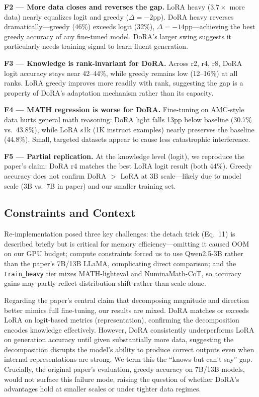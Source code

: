 \documentclass[11pt,twocolumn]{article}
\begin{document}
\textbf{F2 --- More data closes and reverses the gap.} LoRA heavy ($3.7{\times}$ more data) nearly equalizes logit and greedy ($\Delta{=}{-}2$pp). DoRA heavy reverses dramatically---greedy (46\%) exceeds logit (32\%), $\Delta{=}{-}14$pp---achieving the best greedy accuracy of any fine-tuned model. DoRA's larger swing suggests it particularly needs training signal to learn fluent generation.

\textbf{F3 --- Knowledge is rank-invariant for DoRA.} Across r2, r4, r8, DoRA logit accuracy stays near 42--44\%, while greedy remains low (12--16\%) at all ranks. LoRA greedy improves more readily with rank, suggesting the gap is a property of DoRA's adaptation mechanism rather than its capacity.

\textbf{F4 --- MATH regression is worse for DoRA.} Fine-tuning on AMC-style data hurts general math reasoning: DoRA light falls 13pp below baseline (30.7\% vs.\ 43.8\%), while LoRA s1k (1K instruct examples) nearly preserves the baseline (44.8\%). Small, targeted datasets appear to cause less catastrophic interference.

\textbf{F5 --- Partial replication.} At the knowledge level (logit), we reproduce the paper's claim: DoRA r4 matches the best LoRA logit result (both 44\%). Greedy accuracy does not confirm DoRA $>$ LoRA at 3B scale---likely due to model scale (3B vs.\ 7B in paper) and our smaller training set.

\subsection{Constraints and Context}
Re-implementation posed three key challenges: the detach trick (Eq.~11) is described briefly but is critical for memory efficiency---omitting it caused OOM on our GPU budget; compute constraints forced us to use Qwen2.5-3B rather than the paper's 7B/13B LLaMA, complicating direct comparison; and the \texttt{train\_heavy} tier mixes MATH-lighteval and NuminaMath-CoT, so accuracy gains may partly reflect distribution shift rather than scale alone. 

Regarding the paper's central claim that decomposing magnitude and direction better mimics full fine-tuning, our results are mixed. DoRA matches or exceeds LoRA on logit-based metrics (representation), confirming the decomposition encodes knowledge effectively. However, DoRA consistently underperforms LoRA on generation accuracy until given substantially more data, suggesting the decomposition disrupts the model's ability to produce correct outputs even when internal representations are strong. We term this the ``knows but can't say'' gap. Crucially, the original paper's evaluation, greedy accuracy on 7B/13B models, would not surface this failure mode, raising the question of whether DoRA's advantages hold at smaller scales or under tighter data regimes.
\end{document}
